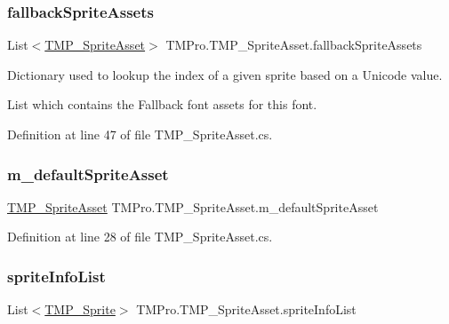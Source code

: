 \subsubsection{\texorpdfstring{fallbackSpriteAssets}{fallbackSpriteAssets}}
{\footnotesize\ttfamily List$<$\mbox{\hyperlink{class_t_m_pro_1_1_t_m_p___sprite_asset}{T\+M\+P\+\_\+\+Sprite\+Asset}}$>$ T\+M\+Pro.\+T\+M\+P\+\_\+\+Sprite\+Asset.\+fallback\+Sprite\+Assets}



Dictionary used to lookup the index of a given sprite based on a Unicode value. 

List which contains the Fallback font assets for this font. 

Definition at line 47 of file T\+M\+P\+\_\+\+Sprite\+Asset.\+cs.

\mbox{\label{class_t_m_pro_1_1_t_m_p___sprite_asset_a9fb75fde5a5226e9ee1f05a0aaf94e9d}} 
\subsubsection{\texorpdfstring{m\_defaultSpriteAsset}{m\_defaultSpriteAsset}}
{\footnotesize\ttfamily \mbox{\hyperlink{class_t_m_pro_1_1_t_m_p___sprite_asset}{T\+M\+P\+\_\+\+Sprite\+Asset}} T\+M\+Pro.\+T\+M\+P\+\_\+\+Sprite\+Asset.\+m\+\_\+default\+Sprite\+Asset\hspace{0.3cm}{\ttfamily [static]}}



Definition at line 28 of file T\+M\+P\+\_\+\+Sprite\+Asset.\+cs.

\mbox{\label{class_t_m_pro_1_1_t_m_p___sprite_asset_a6770844be35fbf6d455eadbc9a528372}} 
\subsubsection{\texorpdfstring{spriteInfoList}{spriteInfoList}}
{\footnotesize\ttfamily List$<$\mbox{\hyperlink{class_t_m_pro_1_1_t_m_p___sprite}{T\+M\+P\+\_\+\+Sprite}}$>$ T\+M\+Pro.\+T\+M\+P\+\_\+\+Sprite\+Asset.\+sprite\+Info\+List}



